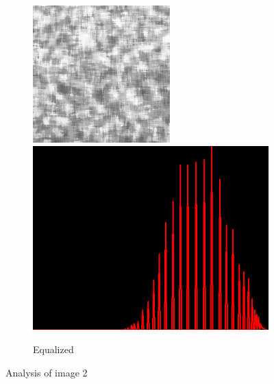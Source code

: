 \begin{figure}[H]
\begin{subfigure}[b]{0.28\textwidth}
        \begin{center}
        	\text{ }
        \end{center}
        \includegraphics[width=\textwidth]{img2/rect_eee_eql_res_total.png}\\[0.1cm]
        \includegraphics[width=\textwidth]{img2/hist_rect_eee_eql_res_total.png}
        \caption{Equalized}
        \label{fig:img2_histEq}
    \end{subfigure}
    \caption{Analysis of image 2}\label{fig:img2}
\end{figure}

